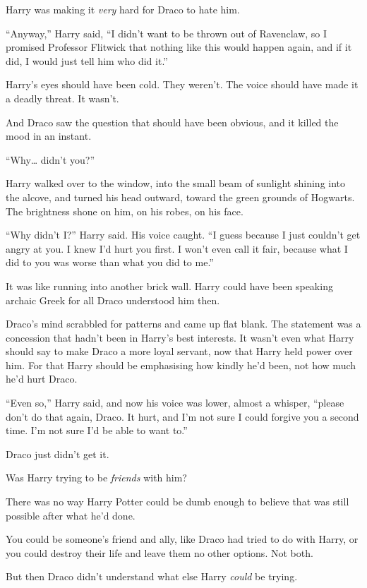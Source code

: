 Harry was making it \emph{very} hard for Draco to hate him.

``Anyway,'' Harry said, ``I didn't want to be thrown out of Ravenclaw,
so I promised Professor Flitwick that nothing like this would happen
again, and if it did, I would just tell him who did it.''

Harry's eyes should have been cold. They weren't. The voice should have
made it a deadly threat. It wasn't.

And Draco saw the question that should have been obvious, and it killed
the mood in an instant.

``Why\ldots{} didn't you?''

Harry walked over to the window, into the small beam of sunlight shining
into the alcove, and turned his head outward, toward the green grounds
of Hogwarts. The brightness shone on him, on his robes, on his face.

``Why didn't I?'' Harry said. His voice caught. ``I guess because I just
couldn't get angry at you. I knew I'd hurt you first. I won't even call
it fair, because what I did to you was worse than what you did to me.''

It was like running into another brick wall. Harry could have been
speaking archaic Greek for all Draco understood him then.

Draco's mind scrabbled for patterns and came up flat blank. The
statement was a concession that hadn't been in Harry's best interests.
It wasn't even what Harry should say to make Draco a more loyal servant,
now that Harry held power over him. For that Harry should be emphasising
how kindly he'd been, not how much he'd hurt Draco.

``Even so,'' Harry said, and now his voice was lower, almost a whisper,
``please don't do that again, Draco. It hurt, and I'm not sure I could
forgive you a second time. I'm not sure I'd be able to want to.''

Draco just didn't get it.

Was Harry trying to be \emph{friends} with him?

There was no way Harry Potter could be dumb enough to believe that was
still possible after what he'd done.

You could be someone's friend and ally, like Draco had tried to do with
Harry, or you could destroy their life and leave them no other options.
Not both.

But then Draco didn't understand what else Harry \emph{could} be trying.

